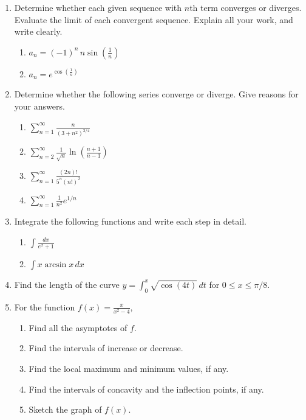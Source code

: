 \documentclass[a4paper, 12pt]{article}
\begin{document}
\begin{enumerate}[leftmargin=*,label=\textbf{\arabic*.}]

\item Determine whether each given sequence with $n$th term converges or diverges. Evaluate the limit of each convergent sequence. Explain all your work, and write clearly.

\begin{enumerate}[leftmargin=*,label=\textbf{\alph*.}]
\item $\displaystyle a_n=(-1)^n\,n\sin\left(\frac1n\right)$
\item $\displaystyle a_n= e^{\cos\left(\textstyle\frac1n\right)}$
\end{enumerate}

\item Determine whether the following series converge or diverge. Give reasons for your answers.
\begin{enumerate}[leftmargin=*,label=\textbf{\alph*.}]
\item $\displaystyle\sum_{n=1}^\infty\frac n{\left(3+n^2\right)^{3/4}}$
\item $\displaystyle\sum_{n=2}^\infty\frac1{\sqrt n}\ln\left(\frac{n+1}{n-1}\right)$
\item $\displaystyle\sum_{n=1}^\infty\frac{(2n)!}{5^n\left(n!\right)^2}$
\item $\displaystyle\sum_{n=1}^\infty\frac1{n^2} e^{1/n}$
\end{enumerate}

\item Integrate the following functions and write each step in detail.
\begin{enumerate}[leftmargin=*,label=\textbf{\alph*.}]
\item $\displaystyle\int\frac{dx}{ e^x+1}$
\item $\displaystyle\int x\arcsin x\,dx$
\end{enumerate}

\item Find the length of the curve $\displaystyle y=\int_0^x\sqrt{\cos\left(4t\right)}\,dt$ for $0\leq x\leq \pi/8$.
\item For the function $\displaystyle f(x)=\frac x{x^2-4}$,
\begin{enumerate}[leftmargin=*,label=\textbf{\alph*.}]
\item Find all the asymptotes of $f$.
\item Find the intervals of increase or decrease.
\item Find the local maximum and minimum values, if any.
\item Find the intervals of concavity and the inflection points, if any.
\item Sketch the graph of $f(x)$.
\end{enumerate}
\end{enumerate}
\end{document}
